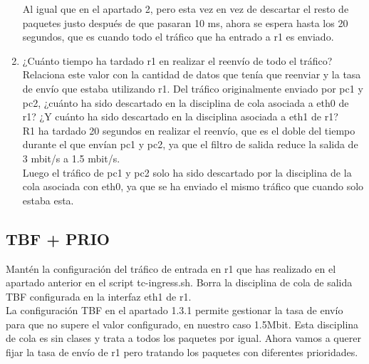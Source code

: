 \documentclass[12pt, a4paper]{report}
\begin{document}
\begin{enumerate}
\begin{figure}[H]
	\end{figure}
	Al igual que en el apartado 2, pero esta vez en vez de descartar el resto de paquetes justo después de que pasaran 10 ms, ahora se espera hasta los 20 segundos, que es cuando todo el tráfico que ha entrado a r1 es enviado.
	\item ¿Cuánto tiempo ha tardado r1 en realizar el reenvío de todo el tráfico? Relaciona este valor con
	la cantidad de datos que tenía que reenviar y la tasa de envío que estaba utilizando r1. Del
	tráfico originalmente enviado por pc1 y pc2, ¿cuánto ha sido descartado en la disciplina de cola
	asociada a eth0 de r1? ¿Y cuánto ha sido descartado en la disciplina asociada a eth1 de r1?\\
	
	R1 ha tardado 20 segundos en realizar el reenvío, que es el doble del tiempo durante el que envían pc1 y pc2, ya que el filtro de salida reduce la salida de 3 mbit/s a 1.5 mbit/s.\\
	
	Luego el tráfico de pc1 y pc2 solo ha sido descartado por la disciplina de la cola asociada con eth0, ya que se ha enviado el mismo tráfico que cuando solo estaba esta.
\end{enumerate}
\subsection{TBF + PRIO}
Mantén la configuración del tráfico de entrada en r1 que has realizado en el apartado anterior en
el script tc-ingress.sh. Borra la disciplina de cola de salida TBF configurada en la interfaz eth1 de
r1.\\

La configuración TBF en el apartado 1.3.1 permite gestionar la tasa de envío para que no supere
el valor configurado, en nuestro caso 1.5Mbit. Esta disciplina de cola es sin clases y trata a todos los
paquetes por igual. Ahora vamos a querer fijar la tasa de envío de r1 pero tratando los paquetes con
diferentes prioridades.\\
\end{document}

